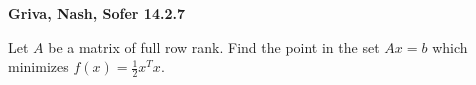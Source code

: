 \textbf{Griva, Nash, Sofer 14.2.7}

Let $A$ be a matrix of full row rank. Find the point in the set $Ax = b$ which minimizes $f(x) = \frac{1}{2} x^T x$.

\begin{solution}
\end{solution}